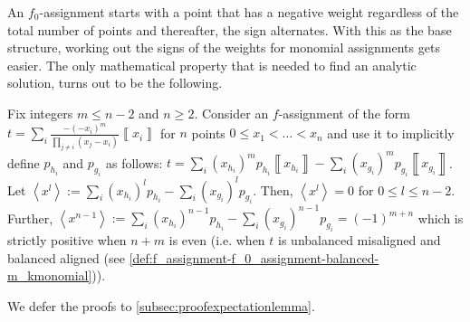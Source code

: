 \documentclass{article}
\begin{document}
An $f_{0}$-assignment starts with a
point that has a negative weight regardless of the total number of points and thereafter, the sign alternates. With
this as the base structure, working out the signs of the weights for
monomial assignments gets easier. %
The only mathematical
property that is needed to find an analytic
solution, turns out to be the following.
\begin{lemma}
  Fix integers $m\le n-2$ and $n\ge2$. Consider an $f$-assignment of
  the form $t=\sum_{i}\frac{-(-x_{i})^{m}}{\prod_{j\neq i}(x_{j}-x_{i})}\left\llbracket x_{i}\right\rrbracket $
  for $n$ points $0\le x_{1} < \dots <x_{n}$ and use it to implicitly
  define $p_{h_{i}}$ and $p_{g_{i}}$ as follows: $t=\sum_{i}(x_{h_{i}})^{m}p_{h_{i}}\left\llbracket x_{h_{i}}\right\rrbracket -\sum_{i}(x_{g_{i}})^{m}p_{g_{i}}\left\llbracket x_{g_{i}}\right\rrbracket $.
  Let $\left\langle x^{l}\right\rangle :=\sum_{i}(x_{h_{i}})^{l}p_{h_{i}}-\sum_{i}(x_{g_{i}})^{l}p_{g_{i}}$. Then, $\left\langle x^{l}\right\rangle =0$ for $0\le l\le n-2$.
  Further, $\left\langle x^{n-1}\right\rangle :=\sum_{i}(x_{h_{i}})^{n-1}p_{h_{i}}-\sum_{i}(x_{g_{i}})^{n-1}p_{g_{i}}=(-1)^{m+n}$
  which is strictly positive when $n+m$ is even (i.e. when
  $t$ is unbalanced misaligned and balanced aligned (see \cref{def:f_assignment-f_0_assignment-balanced-m_kmonomial})).

  \label{lem:expectationLemma}
\end{lemma}
We defer the proofs to \cref{subsec:proofexpectationlemma}.
\end{document}
